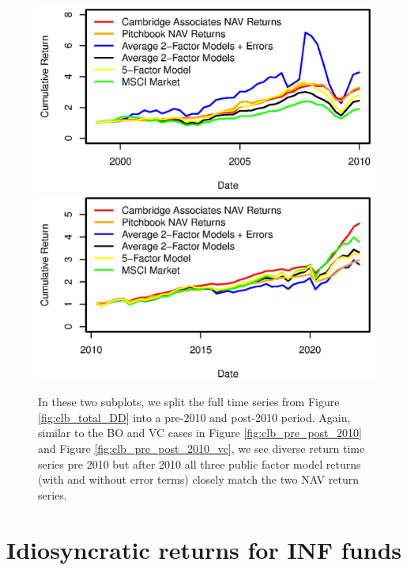 \begin{figure}[H]
	\centering
	\includegraphics{Figures/XTotalErrorSeriesDDpre2010}
	\includegraphics{Figures/XTotalErrorSeriesDDpost2010}
	\caption{
		In these two subplots, we split the full time series from Figure \ref{fig:clb_total_DD} into a pre-2010 and post-2010 period.
		Again, similar to the BO and VC cases in Figure \ref{fig:clb_pre_post_2010} and  Figure \ref{fig:clb_pre_post_2010_vc}, we see diverse return time series pre 2010 but after 2010 all three public factor model returns (with and without error terms) closely match the two NAV return series.
	}
	\label{fig:clb_pre_post_2010_DD}
\end{figure}


\section{Idiosyncratic returns for INF funds}
\label{sec:inf_errors}


